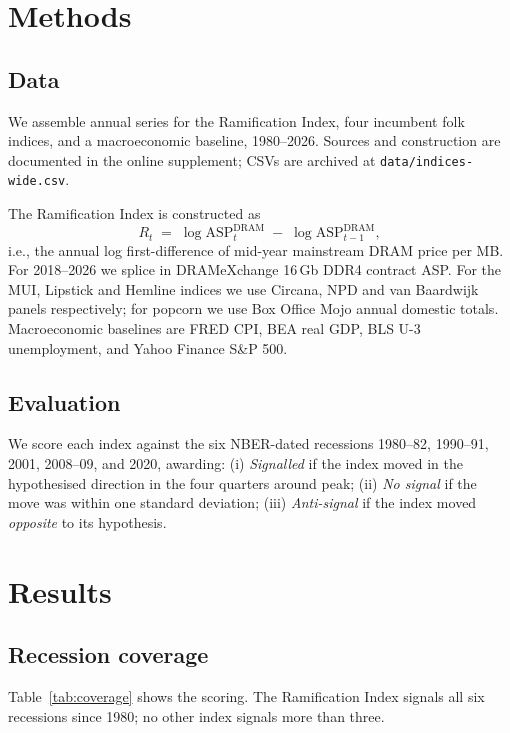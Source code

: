 \documentclass[11pt,a4paper]{article}
\begin{document}
\section{Methods}\label{sec:method}

\subsection{Data}

We assemble annual series for the Ramification Index, four incumbent folk indices, and a macroeconomic baseline, 1980--2026. Sources and construction are documented in the online supplement; CSVs are archived at \verb|data/indices-wide.csv|.

The Ramification Index is constructed as
\[
  R_t \;=\; \log \mathrm{ASP}^{\mathrm{DRAM}}_t \;-\; \log \mathrm{ASP}^{\mathrm{DRAM}}_{t-1},
\]
i.e., the annual log first-difference of mid-year mainstream DRAM price per MB. For 2018--2026 we splice in DRAMeXchange 16\,Gb DDR4 contract ASP. For the MUI, Lipstick and Hemline indices we use Circana, NPD and van Baardwijk panels respectively; for popcorn we use Box Office Mojo annual domestic totals. Macroeconomic baselines are FRED CPI, BEA real GDP, BLS U-3 unemployment, and Yahoo Finance S\&P 500.

\subsection{Evaluation}

We score each index against the six NBER-dated recessions 1980--82, 1990--91, 2001, 2008--09, and 2020, awarding:
(i) \emph{Signalled} if the index moved in the hypothesised direction in the four quarters around peak;
(ii) \emph{No signal} if the move was within one standard deviation;
(iii) \emph{Anti-signal} if the index moved \emph{opposite} to its hypothesis.

\section{Results}\label{sec:results}

\subsection{Recession coverage}

Table~\ref{tab:coverage} shows the scoring. The Ramification Index signals all six recessions since 1980; no other index signals more than three.
\end{document}
